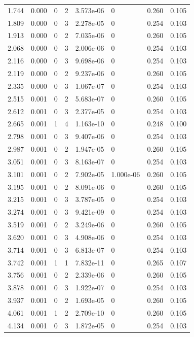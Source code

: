 \documentclass[preview]{standalone}
\begin{document}
{{\begin{tabular}{L{1.2cm}C{1.2cm} C{0.3cm}C{0.5cm} C{1.4cm}C{1.4cm} C{1.4cm}C{1.4cm}}
  1.744  &  0.000  & 0     &  2 &  3.573e-06  & 0  & 0.260 &  0.105   \\ 
  1.809  &  0.000  & 0     &  3 &  2.278e-05  & 0  & 0.254 &  0.103   \\ 
  1.913  &  0.000  & 0     &  2 &  7.035e-06  & 0  & 0.260 &  0.105   \\ 
  2.068  &  0.000  & 0     &  3 &  2.006e-06  & 0  & 0.254 &  0.103   \\ 
  2.116  &  0.000  & 0     &  3 &  9.698e-06  & 0  & 0.254 &  0.103   \\ 
  2.119  &  0.000  & 0     &  2 &  9.237e-06  & 0  & 0.260 &  0.105   \\ 
  2.335  &  0.000  & 0     &  3 &  1.067e-07  & 0  & 0.254 &  0.103   \\ 
  2.515  &  0.001  & 0     &  2 &  5.683e-07  & 0  & 0.260 &  0.105   \\ 
  2.612  &  0.001  & 0     &  3 &  2.377e-05  & 0  & 0.254 &  0.103   \\ 
  2.665  &  0.001  & 1     &  4 &  1.163e-10  & 0  & 0.248 &  0.100   \\ 
  2.798  &  0.001  & 0     &  3 &  9.407e-06  & 0  & 0.254 &  0.103   \\ 
  2.987  &  0.001  & 0     &  2 &  1.947e-05  & 0  & 0.260 &  0.105   \\ 
  3.051  &  0.001  & 0     &  3 &  8.163e-07  & 0  & 0.254 &  0.103   \\ 
  3.101  &  0.001  & 0     &  2 &  7.902e-05  & 1.000e-06  & 0.260 &  0.105   \\ 
  3.195  &  0.001  & 0     &  2 &  8.091e-06  & 0  & 0.260 &  0.105   \\ 
  3.215  &  0.001  & 0     &  3 &  3.787e-05  & 0  & 0.254 &  0.103   \\ 
  3.274  &  0.001  & 0     &  3 &  9.421e-09  & 0  & 0.254 &  0.103   \\ 
  3.519  &  0.001  & 0     &  2 &  3.249e-06  & 0  & 0.260 &  0.105   \\ 
  3.620  &  0.001  & 0     &  3 &  4.908e-06  & 0  & 0.254 &  0.103   \\ 
  3.714  &  0.001  & 0     &  3 &  6.813e-07  & 0  & 0.254 &  0.103   \\ 
  3.742  &  0.001  & 1     &  1 &  7.832e-11  & 0  & 0.265 &  0.107   \\ 
  3.756  &  0.001  & 0     &  2 &  2.339e-06  & 0  & 0.260 &  0.105   \\ 
  3.878  &  0.001  & 0     &  3 &  1.922e-07  & 0  & 0.254 &  0.103   \\ 
  3.937  &  0.001  & 0     &  2 &  1.693e-05  & 0  & 0.260 &  0.105   \\ 
  4.061  &  0.001  & 1     &  2 &  2.709e-10  & 0  & 0.260 &  0.105   \\ 
  4.134  &  0.001  & 0     &  3 &  1.872e-05  & 0  & 0.254 &  0.103   \\ 
\hline 
\end{tabular} 

}}
\end{document}
